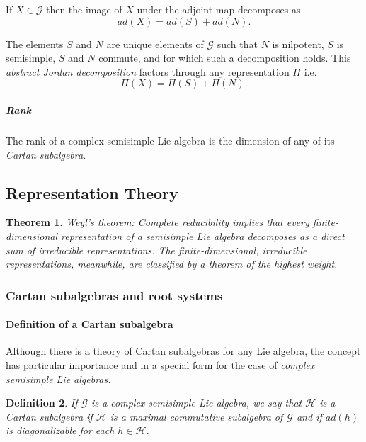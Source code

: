 \documentclass[aps,preprint]{revtex4}%
\newtheorem{theorem}{Theorem}
\newtheorem{definition}[theorem]{Definition}
\begin{document}
If $X\in\mathcal{G}$ then the image of $X$ under the adjoint map decomposes
as
\begin{equation}
ad\left(  X\right)  =ad\left(  S\right)  +ad\left(  N\right)  .
\end{equation}


The elements $S$ and $N$ are unique elements of $\mathcal{G}$ such that $N$ is
nilpotent, $S$ is semisimple, $S$ and $N$ commute, and for which such a
decomposition holds. This \emph{abstract Jordan decomposition} factors through
any representation $\Pi$ i.e.
\begin{equation}
\Pi\left(  X\right)  =\Pi\left(  S\right)  +\Pi\left(  N\right)  .
\end{equation}


\subparagraph{Rank}

The rank of a complex semisimple Lie algebra is the dimension of any of its
\emph{Cartan subalgebra}.

\subsection{Representation Theory}

\begin{theorem}
\emph{Weyl's theorem:} Complete reducibility implies that every
finite-dimensional representation of a semisimple Lie algebra decomposes as a
direct sum of irreducible representations. The finite-dimensional, irreducible
representations, meanwhile, are classified by a theorem of the highest weight.
\end{theorem}

\subsubsection{Cartan subalgebras and root systems}

\paragraph{Definition of a Cartan subalgebra}

Although there is a theory of Cartan subalgebras for any Lie algebra, the
concept has particular importance and in a special form for the case of
\emph{complex semisimple Lie algebras.}

\begin{definition}
If $\mathcal{G}$ is a complex semisimple Lie algebra, we say that
$\mathcal{H}$ is a\emph{ Cartan subalgebra} if $\mathcal{H}$ is a
\emph{maximal commutative} subalgebra of $\mathcal{G}$ and if $ad\left(
h\right)  $ is diagonalizable for each $h\in\mathcal{H}$.
\end{definition}
\end{document}

